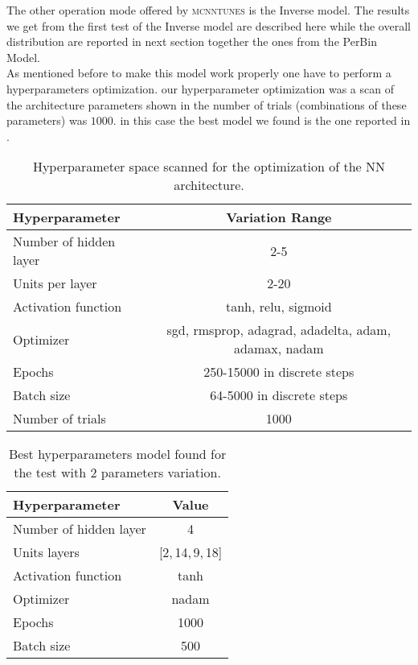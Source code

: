 The other operation mode offered by \textsc{mcnntunes} is the Inverse model. 
The results we get from the first test of the Inverse model are described here while the overall distribution are reported in next section together the ones from the PerBin Model. 
\\
As mentioned before to make this model work properly one have to perform a hyperparameters optimization. our hyperparameter optimization was a scan of the architecture parameters shown in  the number of trials (combinations of these parameters) was $1000$. in this case the best model we found is the one reported in .
\begin{table}[!htb]
	\centering
	\begin{tabular}{| l | c |}
	\hline
	Hyperparameter & Variation Range\\[2pt]\hline
	Number of hidden layer & 2-5 \\[2pt]
	Units per layer & 2-20 \\[2pt]
	Activation function & tanh, relu, sigmoid \\[2pt]
	Optimizer & {\small sgd, rmsprop, adagrad, adadelta, adam, adamax, nadam}\\[2pt]
	Epochs & 250-15000 in discrete steps\\[2pt]
	Batch size & 64-5000 in discrete steps\\[2pt] \hline
	Number of trials & 1000\\[2pt]\hline
	\end{tabular}
	\caption{Hyperparameter space scanned for the optimization of the NN architecture.}
	\label{table:hyperpar_MinBias_2par}
\end{table}


\begin{table}[!htb]
	\centering
	\begin{tabular}{ l | c }
	Hyperparameter & Value\\[2pt]\hline\hline
	Number of hidden layer & 4 \\[2pt]
	Units layers & [2,\,14,\,9,\,18] \\[2pt]
	Activation function & tanh \\[2pt]
	Optimizer & nadam\\[2pt]
	Epochs & 1000\\[2pt]
	Batch size & 500\\[2pt]
	\end{tabular}
	\caption{Best hyperparameters model found for the test with 2 parameters variation.}
	\label{table:hyperpar_2parTEST}
\end{table}

